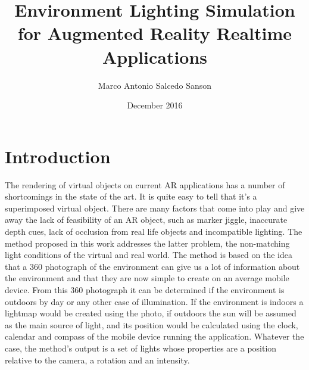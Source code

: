 \documentclass{article}
\title{Environment Lighting Simulation for Augmented Reality Realtime Applications}
\author{Marco Antonio Salcedo Sanson }
\date{December 2016}
\begin{document}
\maketitle

\section{Introduction}
The rendering of virtual objects on current AR applications has a number of shortcomings in the state of the art. It is quite easy to tell that it’s a superimposed virtual object. There are many factors that come into play and give away the lack of feasibility of an AR object, such as marker jiggle, inaccurate depth cues, lack of occlusion from real life objects and incompatible lighting.
The method proposed in this work addresses the latter problem, the non-matching light conditions of the virtual and real world. The method is based on the idea that a 360 photograph of the environment can give us a lot of information about the environment and that they are now simple to create on an average mobile device. From this 360 photograph it can be determined if the environment is outdoors by day or any other case of illumination. If the environment is indoors a lightmap would be created using the photo, if outdoors the sun will be assumed as the main source of light, and its position would be calculated using the clock, calendar and compass of the mobile device running the application. 
Whatever the case, the method's output is a set of lights whose properties are a position relative to the camera, a rotation and an intensity.
\end{document}
